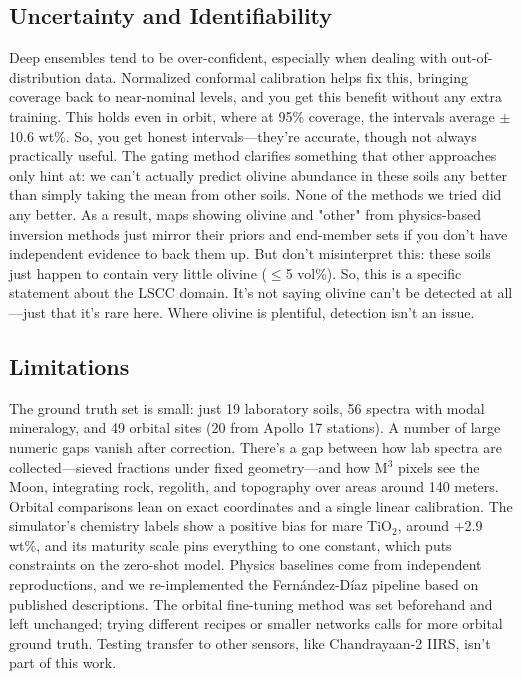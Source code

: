 \documentclass[remotesensing,article,submit,pdftex,moreauthors]{Definitions/mdpi}
\begin{document}
\subsection{Uncertainty and Identifiability}

Deep ensembles tend to be over-confident, especially when dealing with out-of-distribution data. Normalized conformal calibration helps fix this, bringing coverage back to near-nominal levels, and you get this benefit without any extra training. This holds even in orbit, where at 95\% coverage, the intervals average $\pm$10.6 wt\%. So, you get honest intervals---they're accurate, though not always practically useful. The gating method clarifies something that other approaches only hint at: we can't actually predict olivine abundance in these soils any better than simply taking the mean from other soils. None of the methods we tried did any better. As a result, maps showing olivine and "other" from physics-based inversion methods just mirror their priors and end-member sets if you don't have independent evidence to back them up. But don't misinterpret this: these soils just happen to contain very little olivine ($\leq$5 vol\%). So, this is a specific statement about the LSCC domain. It's not saying olivine can't be detected at all---just that it's rare here. Where olivine is plentiful, detection isn't an issue.

\subsection{Limitations}

The ground truth set is small: just 19 laboratory soils, 56 spectra with modal mineralogy, and 49 orbital sites (20 from Apollo 17 stations). A number of large numeric gaps vanish after correction. There's a gap between how lab spectra are collected---sieved fractions under fixed geometry---and how M$^{3}$ pixels see the Moon, integrating rock, regolith, and topography over areas around 140 meters. Orbital comparisons lean on exact coordinates and a single linear calibration. The simulator's chemistry labels show a positive bias for mare TiO$_{2}$, around +2.9 wt\%, and its maturity scale pins everything to one constant, which puts constraints on the zero-shot model. Physics baselines come from independent reproductions, and we re-implemented the Fernández-Díaz pipeline based on published descriptions. The orbital fine-tuning method was set beforehand and left unchanged; trying different recipes or smaller networks calls for more orbital ground truth. Testing transfer to other sensors, like Chandrayaan-2 IIRS, isn't part of this work.
\end{document}
